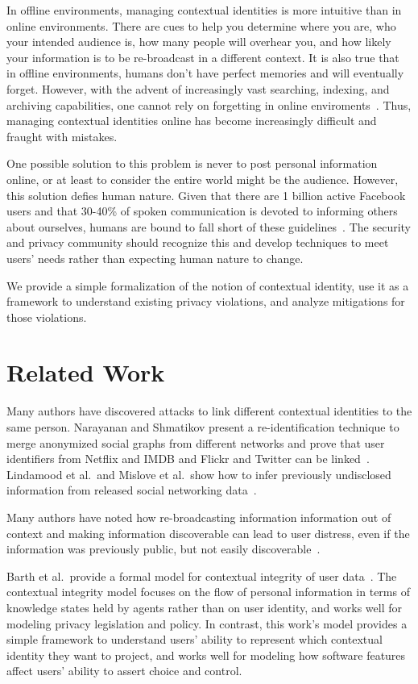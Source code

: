 \documentclass{llncs}
\begin{document}
In offline environments, managing contextual identities is more intuitive than
in online environments. There are cues to help you determine where you are,
who your intended audience is, how many people will overhear you, and how
likely your information is to be re-broadcast in a different context. It is
also true that in offline environments, humans don't have perfect memories and
will eventually forget.  However, with the advent of increasingly vast
searching, indexing, and archiving capabilities, one cannot rely on forgetting
in online enviroments~\cite{delete}. Thus, managing contextual identities
online has become increasingly difficult and fraught with mistakes.

One possible solution to this problem is never to post personal information
online, or at least to consider the entire world might be the audience.
However, this solution defies human nature. Given that there are 1 billion
active Facebook users and that 30-40\% of spoken communication is devoted to
informing others about ourselves, humans are bound to fall short of these
guidelines~\cite{tamir,fbusers}. The security and privacy community should
recognize this and develop techniques to meet users' needs rather than
expecting human nature to change.

We provide a simple formalization of the notion of contextual identity, use it
as a framework to understand existing privacy violations, and analyze
mitigations for those violations.

\section{Related Work}

Many authors have discovered attacks to link different contextual identities to
the same person. Narayanan and Shmatikov present a re-identification technique
to merge anonymized social graphs from different networks and prove that
user identifiers from Netflix and IMDB and Flickr and Twitter can be
linked~\cite{narayanan1,narayanan2}. Lindamood et al.~and Mislove et al.~show
how to infer previously undisclosed information from released social networking
data~\cite{lindamood,mislove}.

Many authors have noted how re-broadcasting information information out of
context and making information discoverable can lead to user distress, even if
the information was previously public, but not easily
discoverable~\cite{boyd1,chew,nissenbaum}.

Barth et al.~provide a formal model for contextual integrity of user
data~\cite{barth}. The contextual integrity model focuses on the flow of
personal information in terms of knowledge states held by agents rather than on
user identity, and works well for modeling privacy legislation and policy. In
contrast, this work's model provides a simple framework to understand users'
ability to represent which contextual identity they want to project, and works
well for modeling how software features affect users' ability to assert choice
and control.
\end{document}
